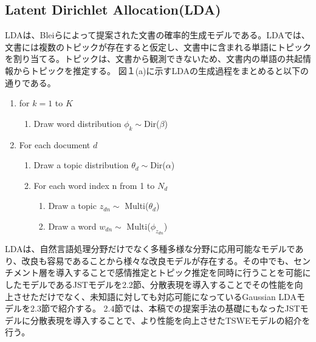 \documentclass[uplatex]{jsarticle}
\begin{document}
\subsection{Latent Dirichlet Allocation(LDA)}
LDAは、Bleiら\cite{LDA}によって提案された文書の確率的生成モデルである。LDAでは、文書には複数のトピックが存在すると仮定し、文書中に含まれる単語にトピックを割り当てる。トピックは、文書から観測できないため、文書内の単語の共起情報からトピックを推定する。
図１(a)に示すLDAの生成過程をまとめると以下の通りである。
\begin{enumerate}
    \item for $k=1$ to $K$
          \begin{enumerate}
              \item Draw word distribution $\phi_{k} \sim $Dir($\beta$)
          \end{enumerate}
    \item For each document $d$
          \begin{enumerate}
              \item Draw a topic distribution $\theta_{d} \sim $Dir($\alpha$)
              \item For each word index n from 1 to $N_{d}$
                    \begin{enumerate}
                        \item Draw a topic $z_{dn} \sim$ Multi($\theta_{d}$)
                        \item Draw a word $w_{dn} \sim$ Multi($\phi_{z_{dn}}$)
                    \end{enumerate}
          \end{enumerate}
\end{enumerate}

LDAは、自然言語処理分野だけでなく多種多様な分野に応用可能なモデルであり、改良も容易であることから様々な改良モデルが存在する。その中でも、センチメント層を導入することで感情推定とトピック推定を同時に行うことを可能にしたモデルであるJST\cite{JST}モデルを2.2節、分散表現を導入することでその性能を向上させただけでなく、未知語に対しても対応可能になっているGaussian LDA\cite{Gaussian LDA}モデルを2.3節で紹介する。
2.4節では、本稿での提案手法の基礎にもなったJSTモデルに分散表現を導入することで、より性能を向上させたTSWE\cite{TSWE}モデルの紹介を行う。
\end{document}

